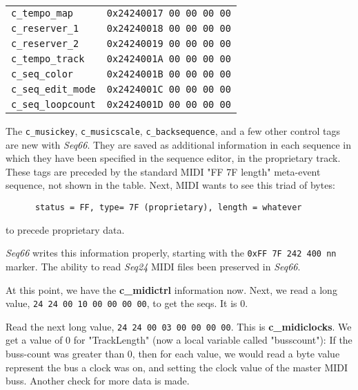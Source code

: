 \begin{table}[htb]
\begin{tabular}{l l}
         \texttt{c\_tempo\_map}     & \texttt{0x24240017 00 00 00 00} \\
         \texttt{c\_reserver\_1}    & \texttt{0x24240018 00 00 00 00} \\
         \texttt{c\_reserver\_2}    & \texttt{0x24240019 00 00 00 00} \\
         \texttt{c\_tempo\_track}   & \texttt{0x2424001A 00 00 00 00} \\
         \texttt{c\_seq\_color}     & \texttt{0x2424001B 00 00 00 00} \\
         \texttt{c\_seq\_edit\_mode} & \texttt{0x2424001C 00 00 00 00} \\
         \texttt{c\_seq\_loopcount} & \texttt{0x2424001D 00 00 00 00} \\
      \end{tabular}
   \end{table}

   The \texttt{c\_musickey},
   \texttt{c\_musicscale},
   \texttt{c\_backsequence}, and a few other
   control tags are new with \textsl{Seq66}.
   They are saved as additional information in each sequence in which they
   have been specified in the sequence editor, in the proprietary track.
   These tags are preceded by the standard MIDI "FF 7F length" meta-event
   sequence, not shown in the table.
   Next, MIDI wants to see this triad of bytes:

   \begin{verbatim}
      status = FF, type= 7F (proprietary), length = whatever
   \end{verbatim}

   to precede proprietary data.

   \textsl{Seq66} writes this information properly,
   starting with the \texttt{0xFF 7F 242 400 nn} marker.
   The ability to read \textsl{Seq24} MIDI files been preserved in
   \textsl{Seq66}.

   At this point, we have the \textbf{c\_midictrl} information now.
   Next, we read a long value,
   \texttt{24 24 00 10 00 00 00 00}, to get the seqs.
   It is 0.

   Read the next long value,
   \texttt{24 24 00 03 00 00 00 00}.
   This is \textbf{c\_midiclocks}.
   We get a value of 0 for "TrackLength" (now a local variable called
   "busscount"):
   If the buss-count was greater than 0, then for each value, we would read a
   byte value represent the bus a clock was on, and setting the clock value
   of the master MIDI buss.
   Another check for more data is made.

